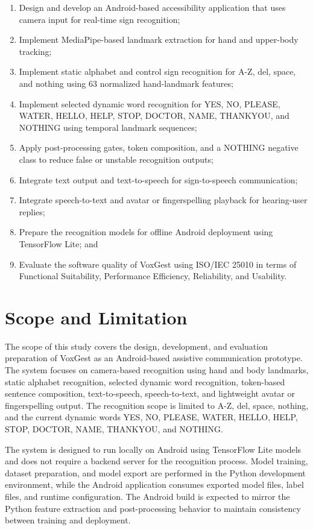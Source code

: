 \begin{enumerate}
    \item Design and develop an Android-based accessibility application that uses camera input for real-time sign recognition;
    \item Implement MediaPipe-based landmark extraction for hand and upper-body tracking;
    \item Implement static alphabet and control sign recognition for A-Z, del, space, and nothing using 63 normalized hand-landmark features;
    \item Implement selected dynamic word recognition for YES, NO, PLEASE, WATER, HELLO, HELP, STOP, DOCTOR, NAME, THANKYOU, and NOTHING using temporal landmark sequences;
    \item Apply post-processing gates, token composition, and a NOTHING negative class to reduce false or unstable recognition outputs;
    \item Integrate text output and text-to-speech for sign-to-speech communication;
    \item Integrate speech-to-text and avatar or fingerspelling playback for hearing-user replies;
    \item Prepare the recognition models for offline Android deployment using TensorFlow Lite; and
    \item Evaluate the software quality of VoxGest using ISO/IEC 25010 in terms of Functional Suitability, Performance Efficiency, Reliability, and Usability.
\end{enumerate}

\section{Scope and Limitation}

The scope of this study covers the design, development, and evaluation preparation of VoxGest as an Android-based assistive communication prototype. The system focuses on camera-based recognition using hand and body landmarks, static alphabet recognition, selected dynamic word recognition, token-based sentence composition, text-to-speech, speech-to-text, and lightweight avatar or fingerspelling output. The recognition scope is limited to A-Z, del, space, nothing, and the current dynamic words YES, NO, PLEASE, WATER, HELLO, HELP, STOP, DOCTOR, NAME, THANKYOU, and NOTHING.

The system is designed to run locally on Android using TensorFlow Lite models and does not require a backend server for the recognition process. Model training, dataset preparation, and model export are performed in the Python development environment, while the Android application consumes exported model files, label files, and runtime configuration. The Android build is expected to mirror the Python feature extraction and post-processing behavior to maintain consistency between training and deployment.

